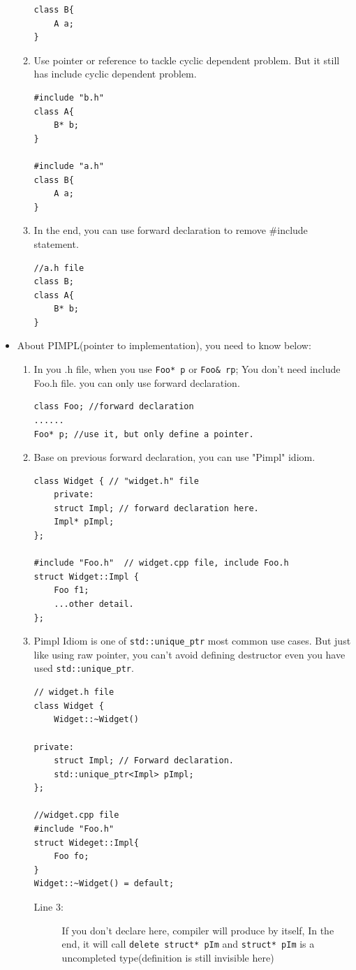 \documentclass[a4paper,11pt,twoside]{book}
\begin{document}
\begin{itemize}
\begin{enumerate}
\begin{lstlisting}[numbers=none]
class B{
	A a;
}
\end{lstlisting}
		\item Use pointer or reference to tackle cyclic dependent problem. But it still has include cyclic dependent problem. 
\begin{lstlisting}[numbers=none]
#include "b.h"
class A{
	B* b;
}
		
#include "a.h"
class B{
	A a;
}
\end{lstlisting}
		\item In the end, you can use forward declaration to remove \#include statement. 
\begin{lstlisting}[numbers=none]
//a.h file 
class B; 
class A{
	B* b;
}
\end{lstlisting}
	\end{enumerate}
	
	\item About PIMPL(pointer to implementation), you need to know below:
	\begin{enumerate}
		\item In you .h file, when you use \texttt{Foo* p} or \texttt{Foo\& rp}; You don't need include Foo.h file. you can only use forward declaration.
\begin{lstlisting}[numbers=none]
class Foo; //forward declaration
......
Foo* p; //use it, but only define a pointer.
\end{lstlisting}
		
		\item Base on previous forward declaration, you can use "Pimpl" idiom.
\begin{lstlisting}[numbers=none]
class Widget { // "widget.h" file
	private:
	struct Impl; // forward declaration here.
	Impl* pImpl;
};
		
#include "Foo.h"  // widget.cpp file, include Foo.h
struct Widget::Impl {
	Foo f1;
	...other detail.
};
\end{lstlisting}
		
		\item Pimpl Idiom is one of \texttt{std::unique\_ptr} most common use cases. But just like using raw pointer,  you can't avoid defining destructor even you have used \texttt{std::unique\_ptr}. 
		
\begin{lstlisting}
// widget.h file
class Widget { 
	Widget::~Widget()
	
private:
	struct Impl; // Forward declaration.
	std::unique_ptr<Impl> pImpl;
};
		
//widget.cpp file
#include "Foo.h" 
struct Wideget::Impl{
	Foo fo; 
}
Widget::~Widget() = default; 
\end{lstlisting}
\begin{description}
	\item[Line 3:] If you don't declare here, compiler will produce by itself, In the end, it will call \texttt{delete struct* pIm} and \texttt{struct* pIm} is a uncompleted type(definition is still invisible here)
	

\end{description}
\end{enumerate}
\end{itemize}
\end{document}

